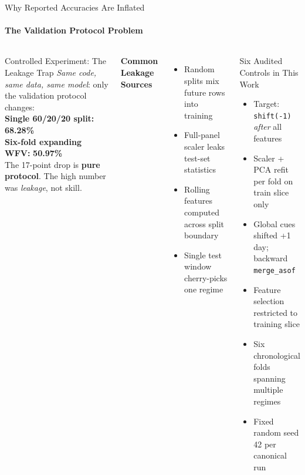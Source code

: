 \documentclass[10pt,aspectratio=43]{beamer}
\newcommand{\hl}[1]{\textcolor{primary}{\textbf{#1}}}
\newcommand{\rd}[1]{\textcolor{tertiary}{\textbf{#1}}}
\newcommand{\gd}[1]{\textcolor{secondary}{\textbf{#1}}}
\begin{document}
\begin{frame}{Why Reported Accuracies Are Inflated}
  \framesubtitle{The Validation Protocol Problem}
  \begin{columns}[T]
      \begin{alertblock}{Controlled Experiment: The Leakage Trap}
        \footnotesize
        \emph{Same code, same data, same model}: only the validation protocol changes:\\[2pt]
        \textbf{Single 60/20/20 split:} \rd{68.28\%}\\
        \textbf{Six-fold expanding WFV:} \hl{50.97\%}\\[2pt]
        The 17-point drop is \textbf{pure protocol}. The high number was \emph{leakage}, not skill.
      \end{alertblock}
      \gd{\textbf{Common Leakage Sources}}
      \begin{itemize}\itemsep1pt\footnotesize
        \item Random splits mix future rows into training
        \item Full-panel scaler leaks test-set statistics
        \item Rolling features computed across split boundary
        \item Single test window cherry-picks one regime
      \end{itemize}
      \begin{exampleblock}{Six Audited Controls in This Work}
        \footnotesize
        \begin{itemize}\itemsep1pt
          \item Target: \texttt{shift(-1)} \emph{after} all features
          \item Scaler + PCA refit per fold on train slice only
          \item Global cues shifted +1 day; backward \texttt{merge\_asof}
          \item Feature selection restricted to training slice
          \item Six chronological folds spanning multiple regimes
          \item Fixed random seed 42 per canonical run
        \end{itemize}
      \end{exampleblock}
  \end{columns}
\end{frame}
\end{document}
